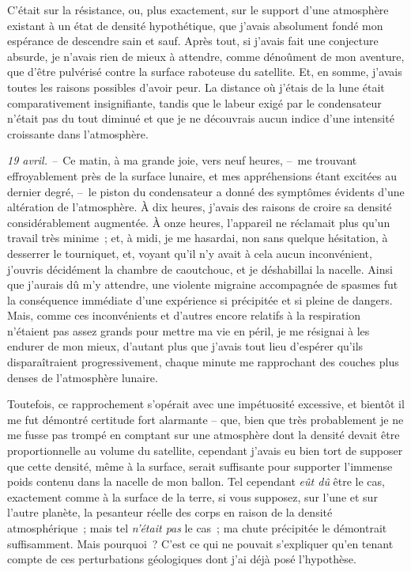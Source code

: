 \documentclass[french,twoside]{book} %
\begin{document}
C’était sur la résistance, ou, plus exactement, sur le support d’une atmosphère existant à un état de densité hypothétique, que j’avais absolument fondé mon espérance de descendre sain et sauf. Après tout, si j’avais fait une conjecture absurde, je n’avais rien de mieux à attendre, comme dénoûment de mon aventure, que d’être pulvérisé contre la surface raboteuse du satellite. Et, en somme, j’avais toutes les raisons possibles d’avoir peur. La distance où j’étais de la lune était comparativement insignifiante, tandis que le labeur exigé par le condensateur n’était pas du tout diminué et que je ne découvrais aucun indice d’une intensité croissante dans l’atmosphère.\par
\emph{19 avril. –} Ce matin, à ma grande joie, vers neuf heures, – me trouvant effroyablement près de la surface lunaire, et mes appréhensions étant excitées au dernier degré, – le piston du condensateur a donné des symptômes évidents d’une altération de l’atmosphère. À dix heures, j’avais des raisons de croire sa densité considérablement augmentée. À onze heures, l’appareil ne réclamait plus qu’un travail très minime ; et, à midi, je me hasardai, non sans quelque hésitation, à desserrer le tourniquet, et, voyant qu’il n’y avait à cela aucun inconvénient, j’ouvris décidément la chambre de caoutchouc, et je déshabillai la nacelle. Ainsi que j’aurais dû m’y attendre, une violente migraine accompagnée de spasmes fut la conséquence immédiate d’une expérience si précipitée et si pleine de dangers. Mais, comme ces inconvénients et d’autres encore relatifs à la respiration n’étaient pas assez grands pour mettre ma vie en péril, je me résignai à les endurer de mon mieux, d’autant plus que j’avais tout lieu d’espérer qu’ils disparaîtraient progressivement, chaque minute me rapprochant des couches plus denses de l’atmosphère lunaire.\par
Toutefois, ce rapprochement s’opérait avec une impétuosité excessive, et bientôt il me fut démontré certitude fort alarmante – que, bien que très probablement je ne me fusse pas trompé en comptant sur une atmosphère dont la densité devait être proportionnelle au volume du satellite, cependant j’avais eu bien tort de supposer que cette densité, même à la surface, serait suffisante pour supporter l’immense poids contenu dans la nacelle de mon ballon. Tel cependant \emph{eût dû} être le cas, exactement comme à la surface de la terre, si vous supposez, sur l’une et sur l’autre planète, la pesanteur réelle des corps en raison de la densité atmosphérique ; mais tel \emph{n’était pas} le cas ; ma chute précipitée le démontrait suffisamment. Mais pourquoi ? C’est ce qui ne pouvait s’expliquer qu’en tenant compte de ces perturbations géologiques dont j’ai déjà posé l’hypothèse.\par
\end{document}

